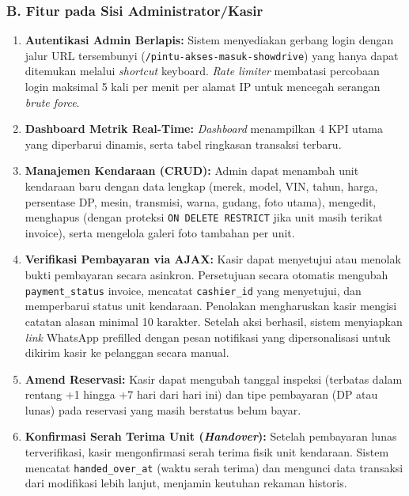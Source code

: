 \documentclass[11pt, a5paper]{article}
\begin{document}
\subsubsection*{B. Fitur pada Sisi Administrator/Kasir}

\begin{enumerate}[label=\arabic*.]
  \item \textbf{Autentikasi Admin Berlapis:} Sistem menyediakan gerbang login
        dengan jalur URL tersembunyi (\texttt{/pintu-akses-masuk-showdrive}) yang
        hanya dapat ditemukan melalui \textit{shortcut} keyboard. \textit{Rate
        limiter} membatasi percobaan login maksimal 5 kali per menit per alamat
        IP untuk mencegah serangan \textit{brute force}.

  \item \textbf{Dashboard Metrik Real-Time:} \textit{Dashboard} menampilkan 4
        KPI utama yang diperbarui dinamis, serta tabel ringkasan transaksi
        terbaru.

  \item \textbf{Manajemen Kendaraan (CRUD):} Admin dapat menambah unit kendaraan
        baru dengan data lengkap (merek, model, VIN, tahun, harga, persentase DP,
        mesin, transmisi, warna, gudang, foto utama), mengedit, menghapus (dengan
        proteksi \texttt{ON DELETE RESTRICT} jika unit masih terikat invoice),
        serta mengelola galeri foto tambahan per unit.

  \item \textbf{Verifikasi Pembayaran via AJAX:} Kasir dapat menyetujui atau
        menolak bukti pembayaran secara asinkron. Persetujuan secara otomatis
        mengubah \texttt{payment\_status} invoice, mencatat \texttt{cashier\_id}
        yang menyetujui, dan memperbarui status unit kendaraan. Penolakan
        mengharuskan kasir mengisi catatan alasan minimal 10 karakter. Setelah
        aksi berhasil, sistem menyiapkan \textit{link} WhatsApp prefilled dengan
        pesan notifikasi yang dipersonalisasi untuk dikirim kasir ke pelanggan
        secara manual.

  \item \textbf{Amend Reservasi:} Kasir dapat mengubah tanggal inspeksi
        (terbatas dalam rentang +1 hingga +7 hari dari hari ini) dan tipe
        pembayaran (DP atau lunas) pada reservasi yang masih berstatus belum
        bayar.

  \item \textbf{Konfirmasi Serah Terima Unit (\textit{Handover}):} Setelah
        pembayaran lunas terverifikasi, kasir mengonfirmasi serah terima fisik
        unit kendaraan. Sistem mencatat \texttt{handed\_over\_at} (waktu serah
        terima) dan mengunci data transaksi dari modifikasi lebih lanjut,
        menjamin keutuhan rekaman historis.


\end{enumerate}
\end{document}
